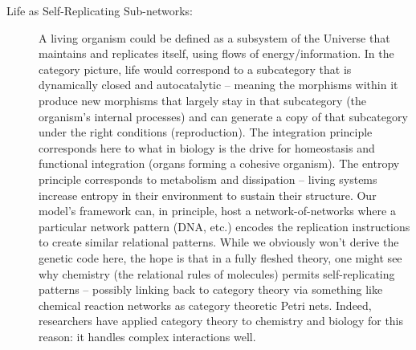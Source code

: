 \documentclass{article}
\begin{document}
\begin{description}
\item[Life as Self-Replicating Sub-networks:] A living organism could be defined as a subsystem of the Universe that maintains and replicates itself, using flows of energy/information. In the category picture, life would correspond to a subcategory that is dynamically closed and autocatalytic – meaning the morphisms within it produce new morphisms that largely stay in that subcategory (the organism’s internal processes) and can generate a copy of that subcategory under the right conditions (reproduction). The integration principle corresponds here to what in biology is the drive for homeostasis and functional integration (organs forming a cohesive organism). The entropy principle corresponds to metabolism and dissipation – living systems increase entropy in their environment to sustain their structure. Our model’s framework can, in principle, host a network-of-networks where a particular network pattern (DNA, etc.) encodes the replication instructions to create similar relational patterns. While we obviously won’t derive the genetic code here, the hope is that in a fully fleshed theory, one might see why chemistry (the relational rules of molecules) permits self-replicating patterns – possibly linking back to category theory via something like chemical reaction networks as category theoretic Petri nets. Indeed, researchers have applied category theory to chemistry and biology for this reason: it handles complex interactions well.


\end{description}
\end{document}
